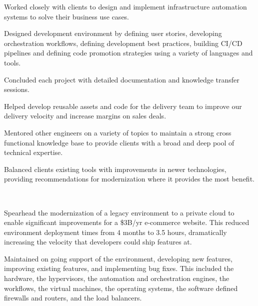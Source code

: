 \documentclass[letterpaper]{deedy-resume-openfont} %
\begin{document}
\begin{minipage}[t]{0.70\textwidth}
\begin{tightitemize}
\item Worked closely with clients to design and implement infrastructure automation systems to solve their business use cases.
\item Designed development environment by defining user stories, developing orchestration workflows, defining development best practices, building CI/CD pipelines and defining code promotion strategies using a variety of languages and tools.
\item Concluded each project with detailed documentation and knowledge transfer sessions.
\item Helped develop reusable assets and code for the delivery team to improve our delivery velocity and increase margins on sales deals.
\item Mentored other engineers on a variety of topics to maintain a strong cross functional knowledge base to provide clients with a broad and deep pool of technical expertise.
\item Balanced clients existing tools with improvements in newer technologies, providing recommendations for modernization where it provides the most benefit.

\end{tightitemize}
\sectionspace %

\\

\begin{tightitemize}
\item Spearhead the modernization of a legacy environment to a private cloud to enable significant improvements for a \$3B/yr e-commerce website. This reduced environment deployment times from 4 months to 3.5 hours, dramatically increasing the velocity that developers could ship features at.
\item Maintained on going support of the environment, developing new features, improving existing features, and implementing bug fixes. This included the hardware, the hypervisors, the automation and orchestration engines, the workflows, the virtual machines, the operating systems, the software defined firewalls and routers, and the load balancers.
\end{tightitemize}

\sectionspace %

\end{minipage} %
\end{document}
